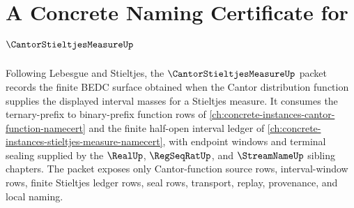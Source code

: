 \chapter{A Concrete Naming Certificate for $\CantorStieltjesMeasureUp$}
\label{ch:concrete-instances-cantor-stieltjes-measure-namecert}

Following Lebesgue and Stieltjes, the $\CantorStieltjesMeasureUp$ packet records the finite BEDC surface obtained when the Cantor distribution function supplies the displayed interval masses for a Stieltjes measure. It consumes the ternary-prefix to binary-prefix function rows of \autoref{ch:concrete-instances-cantor-function-namecert} and the finite half-open interval ledger of \autoref{ch:concrete-instances-stieltjes-measure-namecert}, with endpoint windows and terminal sealing supplied by the $\RealUp$, $\RegSeqRatUp$, and $\StreamNameUp$ sibling chapters. The packet exposes only Cantor-function source rows, interval-window rows, finite Stieltjes ledger rows, seal rows, transport, replay, provenance, and local naming.

